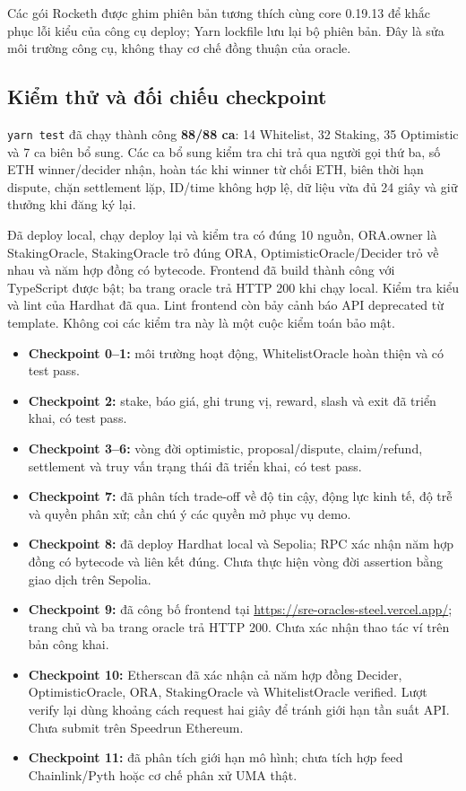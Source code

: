 Các gói Rocketh được ghim phiên bản tương thích cùng core 0.19.13 để khắc phục lỗi kiểu của công cụ deploy; Yarn lockfile lưu lại bộ phiên bản. Đây là sửa môi trường công cụ, không thay cơ chế đồng thuận của oracle.

\subsection{Kiểm thử và đối chiếu checkpoint}

\texttt{yarn test} đã chạy thành công \textbf{88/88 ca}: 14 Whitelist, 32 Staking, 35 Optimistic và 7 ca biên bổ sung. Các ca bổ sung kiểm tra chi trả qua người gọi thứ ba, số ETH winner/decider nhận, hoàn tác khi winner từ chối ETH, biên thời hạn dispute, chặn settlement lặp, ID/time không hợp lệ, dữ liệu vừa đủ 24 giây và giữ thưởng khi đăng ký lại.

Đã deploy local, chạy deploy lại và kiểm tra có đúng 10 nguồn, ORA.owner là StakingOracle, StakingOracle trỏ đúng ORA, OptimisticOracle/Decider trỏ về nhau và năm hợp đồng có bytecode. Frontend đã build thành công với TypeScript được bật; ba trang oracle trả HTTP 200 khi chạy local. Kiểm tra kiểu và lint của Hardhat đã qua. Lint frontend còn bảy cảnh báo API deprecated từ template. Không coi các kiểm tra này là một cuộc kiểm toán bảo mật.

\begin{itemize}
    \item \textbf{Checkpoint 0--1:} môi trường hoạt động, WhitelistOracle hoàn thiện và có test pass.
    \item \textbf{Checkpoint 2:} stake, báo giá, ghi trung vị, reward, slash và exit đã triển khai, có test pass.
    \item \textbf{Checkpoint 3--6:} vòng đời optimistic, proposal/dispute, claim/refund, settlement và truy vấn trạng thái đã triển khai, có test pass.
    \item \textbf{Checkpoint 7:} đã phân tích trade-off về độ tin cậy, động lực kinh tế, độ trễ và quyền phân xử; cần chú ý các quyền mở phục vụ demo.
    \item \textbf{Checkpoint 8:} đã deploy Hardhat local và Sepolia; RPC xác nhận năm hợp đồng có bytecode và liên kết đúng. Chưa thực hiện vòng đời assertion bằng giao dịch trên Sepolia.
    \item \textbf{Checkpoint 9:} đã công bố frontend tại \url{https://sre-oracles-steel.vercel.app/}; trang chủ và ba trang oracle trả HTTP 200. Chưa xác nhận thao tác ví trên bản công khai.
    \item \textbf{Checkpoint 10:} Etherscan đã xác nhận cả năm hợp đồng Decider, OptimisticOracle, ORA, StakingOracle và WhitelistOracle verified. Lượt verify lại dùng khoảng cách request hai giây để tránh giới hạn tần suất API. Chưa submit trên Speedrun Ethereum.
    \item \textbf{Checkpoint 11:} đã phân tích giới hạn mô hình; chưa tích hợp feed Chainlink/Pyth hoặc cơ chế phân xử UMA thật.
\end{itemize}

